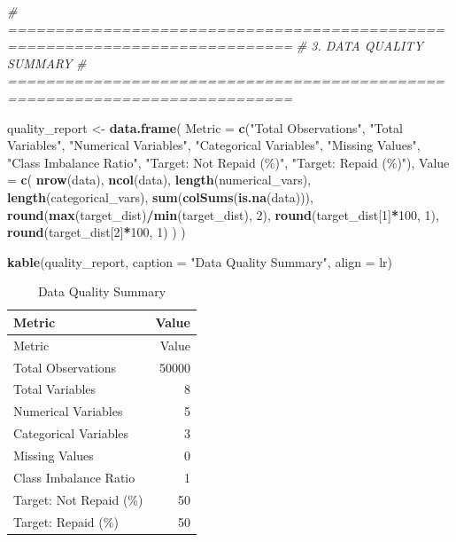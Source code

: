 \documentclass[
]{article}
\newenvironment{Shaded}{\begin{snugshade}}{\end{snugshade}}
\newcommand{\AttributeTok}[1]{\textcolor[rgb]{0.13,0.29,0.53}{#1}}
\newcommand{\CommentTok}[1]{\textcolor[rgb]{0.56,0.35,0.01}{\textit{#1}}}
\newcommand{\DecValTok}[1]{\textcolor[rgb]{0.00,0.00,0.81}{#1}}
\newcommand{\FunctionTok}[1]{\textcolor[rgb]{0.13,0.29,0.53}{\textbf{#1}}}
\newcommand{\NormalTok}[1]{#1}
\newcommand{\OtherTok}[1]{\textcolor[rgb]{0.56,0.35,0.01}{#1}}
\newcommand{\SpecialCharTok}[1]{\textcolor[rgb]{0.81,0.36,0.00}{\textbf{#1}}}
\newcommand{\StringTok}[1]{\textcolor[rgb]{0.31,0.60,0.02}{#1}}
\begin{document}
\begin{Shaded}
\begin{Highlighting}[]
\CommentTok{\# ============================================================================}
\CommentTok{\# 3. DATA QUALITY SUMMARY}
\CommentTok{\# ============================================================================}

\NormalTok{quality\_report }\OtherTok{\textless{}{-}} \FunctionTok{data.frame}\NormalTok{(}
  \AttributeTok{Metric =} \FunctionTok{c}\NormalTok{(}\StringTok{"Total Observations"}\NormalTok{, }\StringTok{"Total Variables"}\NormalTok{, }\StringTok{"Numerical Variables"}\NormalTok{, }
             \StringTok{"Categorical Variables"}\NormalTok{, }\StringTok{"Missing Values"}\NormalTok{, }
             \StringTok{"Class Imbalance Ratio"}\NormalTok{, }\StringTok{"Target: Not Repaid (\%)"}\NormalTok{, }\StringTok{"Target: Repaid (\%)"}\NormalTok{),}
  \AttributeTok{Value =} \FunctionTok{c}\NormalTok{(}
    \FunctionTok{nrow}\NormalTok{(data), }
    \FunctionTok{ncol}\NormalTok{(data), }
    \FunctionTok{length}\NormalTok{(numerical\_vars), }
    \FunctionTok{length}\NormalTok{(categorical\_vars), }
    \FunctionTok{sum}\NormalTok{(}\FunctionTok{colSums}\NormalTok{(}\FunctionTok{is.na}\NormalTok{(data))),}
    \FunctionTok{round}\NormalTok{(}\FunctionTok{max}\NormalTok{(target\_dist)}\SpecialCharTok{/}\FunctionTok{min}\NormalTok{(target\_dist), }\DecValTok{2}\NormalTok{),}
    \FunctionTok{round}\NormalTok{(target\_dist[}\DecValTok{1}\NormalTok{]}\SpecialCharTok{*}\DecValTok{100}\NormalTok{, }\DecValTok{1}\NormalTok{),}
    \FunctionTok{round}\NormalTok{(target\_dist[}\DecValTok{2}\NormalTok{]}\SpecialCharTok{*}\DecValTok{100}\NormalTok{, }\DecValTok{1}\NormalTok{)}
\NormalTok{  )}
\NormalTok{)}

\FunctionTok{kable}\NormalTok{(quality\_report, }\AttributeTok{caption =} \StringTok{"Data Quality Summary"}\NormalTok{, }\AttributeTok{align =} \StringTok{\textquotesingle{}lr\textquotesingle{}}\NormalTok{)}
\end{Highlighting}
\end{Shaded}

\begin{longtable}[]{@{}lr@{}}
\caption{Data Quality Summary}\tabularnewline
\toprule\noalign{}
Metric & Value \\
\midrule\noalign{}
\endfirsthead
\toprule\noalign{}
Metric & Value \\
\midrule\noalign{}
\endhead
\bottomrule\noalign{}
\endlastfoot
Total Observations & 50000 \\
Total Variables & 8 \\
Numerical Variables & 5 \\
Categorical Variables & 3 \\
Missing Values & 0 \\
Class Imbalance Ratio & 1 \\
Target: Not Repaid (\%) & 50 \\
Target: Repaid (\%) & 50 \\
\end{longtable}
\end{document}
